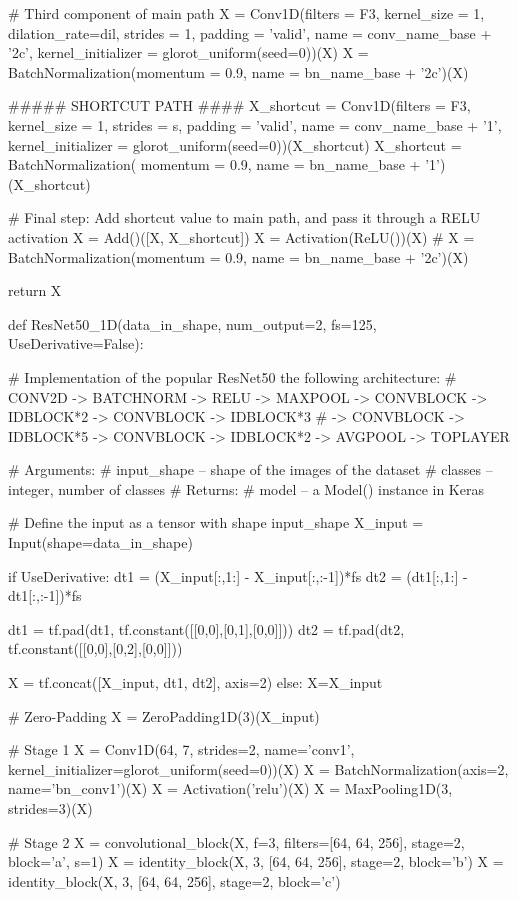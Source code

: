 \begin{python}
    # Third component of main path
    X = Conv1D(filters = F3, kernel_size = 1, dilation_rate=dil, strides = 1, padding = 'valid', name = conv_name_base + '2c', kernel_initializer = glorot_uniform(seed=0))(X)
    X = BatchNormalization(momentum = 0.9, name = bn_name_base + '2c')(X)

    ##### SHORTCUT PATH ####
    X_shortcut = Conv1D(filters = F3, kernel_size = 1, strides = s, padding = 'valid', name = conv_name_base + '1',
                        kernel_initializer = glorot_uniform(seed=0))(X_shortcut)
    X_shortcut = BatchNormalization( momentum = 0.9, name = bn_name_base + '1')(X_shortcut)

    # Final step: Add shortcut value to main path, and pass it through a RELU activation
    X = Add()([X, X_shortcut])
    X = Activation(ReLU())(X)
    # X = BatchNormalization(momentum = 0.9, name = bn_name_base + '2c')(X)
    
    return X

def ResNet50_1D(data_in_shape, num_output=2, fs=125, UseDerivative=False):

    # Implementation of the popular ResNet50 the following architecture:
    # CONV2D -> BATCHNORM -> RELU -> MAXPOOL -> CONVBLOCK -> IDBLOCK*2 -> CONVBLOCK -> IDBLOCK*3
    # -> CONVBLOCK -> IDBLOCK*5 -> CONVBLOCK -> IDBLOCK*2 -> AVGPOOL -> TOPLAYER

    # Arguments:
    # input_shape -- shape of the images of the dataset
    # classes -- integer, number of classes
    # Returns:
    # model -- a Model() instance in Keras

    # Define the input as a tensor with shape input_shape
    X_input = Input(shape=data_in_shape)

    if UseDerivative:
        dt1 = (X_input[:,1:] - X_input[:,:-1])*fs
        dt2 = (dt1[:,1:] - dt1[:,:-1])*fs

        dt1 = tf.pad(dt1, tf.constant([[0,0],[0,1],[0,0]]))
        dt2 = tf.pad(dt2, tf.constant([[0,0],[0,2],[0,0]]))

        X = tf.concat([X_input, dt1, dt2], axis=2)
    else:
        X=X_input

    # Zero-Padding
    X = ZeroPadding1D(3)(X_input)

    # Stage 1
    X = Conv1D(64, 7, strides=2, name='conv1', kernel_initializer=glorot_uniform(seed=0))(X)
    X = BatchNormalization(axis=2, name='bn_conv1')(X)
    X = Activation('relu')(X)
    X = MaxPooling1D(3, strides=3)(X)

    # Stage 2
    X = convolutional_block(X, f=3, filters=[64, 64, 256], stage=2, block='a', s=1)
    X = identity_block(X, 3, [64, 64, 256], stage=2, block='b')
    X = identity_block(X, 3, [64, 64, 256], stage=2, block='c')


\end{python}
